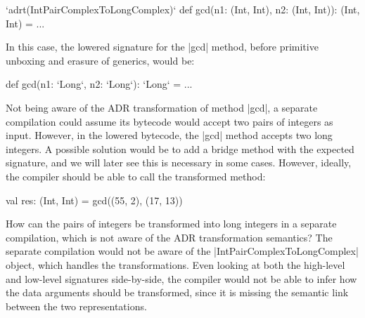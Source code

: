 \begin{lstlisting-nobreak}
`adrt(IntPairComplexToLongComplex)` {
  def gcd(n1: (Int, Int), n2: (Int, Int)): (Int, Int) = ...
}
\end{lstlisting-nobreak}

In this case, the lowered signature for the |gcd| method, before primitive unboxing and erasure of generics, would be:

\begin{lstlisting-nobreak}
def gcd(n1: `Long`, n2: `Long`): `Long` = ...
\end{lstlisting-nobreak}

Not being aware of the ADR transformation of method |gcd|, a separate compilation could assume its bytecode would accept two pairs of integers as input. However, in the lowered bytecode, the |gcd| method accepts two long integers. A possible solution would be to add a bridge method with the expected signature, and we will later see this is necessary in some cases. However, ideally, the compiler should be able to call the transformed method:


\begin{lstlisting-nobreak}
val res: (Int, Int) = gcd((55, 2), (17, 13))
\end{lstlisting-nobreak}

How can the pairs of integers be transformed into long integers in a separate compilation, which is not aware of the ADR transformation semantics? The separate compilation would not be aware of the |IntPairComplexToLongComplex| object, which handles the transformations. Even looking at both the high-level and low-level signatures side-by-side, the compiler would not be able to infer how the data arguments should be transformed, since it is missing the semantic link between the two representations.

